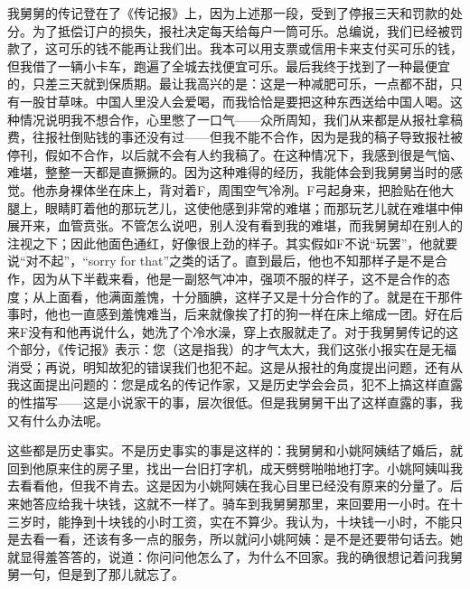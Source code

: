 我舅舅的传记登在了《传记报》上，因为上述那一段，受到了停报三天和罚款的处分。为了抵偿订户的损失，报社决定每天给每户一筒可乐。总编说，我们已经被罚款了，这可乐的钱不能再让我们出。我本可以用支票或信用卡来支付买可乐的钱，但我借了一辆小卡车，跑遍了全城去找便宜可乐。最后我终于找到了一种最便宜的，只差三天就到保质期。最让我高兴的是：这是一种减肥可乐，一点都不甜，只有一股甘草味。中国人里没人会爱喝，而我恰恰是要把这种东西送给中国人喝。这种情况说明我不想合作，心里憋了一口气——众所周知，我们从来都是从报社拿稿费，往报社倒贴钱的事还没有过——但我不能不合作，因为是我的稿子导致报社被停刊，假如不合作，以后就不会有人约我稿了。在这种情况下，我感到很是气恼、难堪，整整一天都是直撅撅的。因为这种难得的经历，我能体会到我舅舅当时的感觉。他赤身裸体坐在床上，背对着F，周围空气冷冽。F弓起身来，把脸贴在他大腿上，眼睛盯着他的那玩艺儿，这使他感到非常的难堪；而那玩艺儿就在难堪中伸展开来，血管贲张。不管怎么说吧，别人没有看到我的难堪，而我舅舅却在别人的注视之下；因此他面色通红，好像很上劲的样子。其实假如F不说“玩罢”，他就要说“对不起”，“sorry for that”之类的话了。直到最后，他也不知那样子是不是合作，因为从下半截来看，他是一副怒气冲冲，强项不服的样子，这不是合作的态度；从上面看，他满面羞愧，十分腼腆，这样子又是十分合作的了。就是在干那件事时，他也一直感到羞愧难当，后来就像挨了打的狗一样在床上缩成一团。好在后来F没有和他再说什么，她洗了个冷水澡，穿上衣服就走了。对于我舅舅传记的这个部分，《传记报》表示：您（这是指我）的才气太大，我们这张小报实在是无福消受；再说，明知故犯的错误我们也犯不起。这是从报社的角度提出问题，还有从我这面提出问题的：您是成名的传记作家，又是历史学会会员，犯不上搞这样直露的性描写——这是小说家干的事，层次很低。但是我舅舅干出了这样直露的事，我又有什么办法呢。 

这些都是历史事实。不是历史事实的事是这样的：我舅舅和小姚阿姨结了婚后，就回到他原来住的房子里，找出一台旧打字机，成天劈劈啪啪地打字。小姚阿姨叫我去看看他，但我不肯去。这是因为小姚阿姨在我心目里已经没有原来的分量了。后来她答应给我十块钱，这就不一样了。骑车到我舅舅那里，来回要用一小时。在十三岁时，能挣到十块钱的小时工资，实在不算少。我认为，十块钱一小时，不能只是去看一看，还该有多一点的服务，所以就问小姚阿姨：是不是还要带句话去。她就显得羞答答的，说道：你问问他怎么了，为什么不回家。我的确很想记着问我舅舅一句，但是到了那儿就忘了。 

